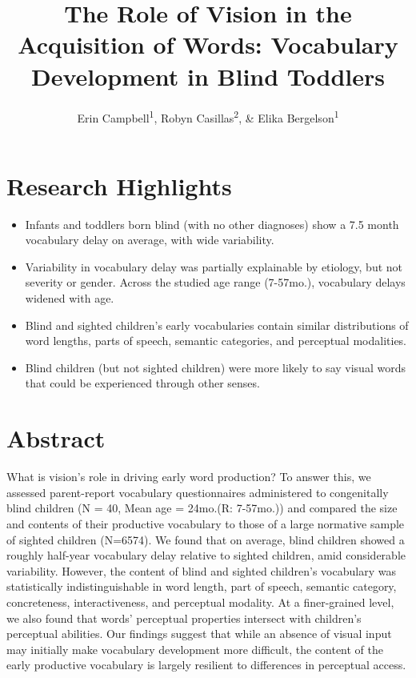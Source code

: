 \documentclass[
  man,floatsintext]{apa6}
\title{The Role of Vision in the Acquisition of Words: Vocabulary Development in Blind Toddlers}
\author{Erin Campbell\textsuperscript{1}, Robyn Casillas\textsuperscript{2}, \& Elika Bergelson\textsuperscript{1}}
\date{}
\affiliation{\vspace{0.5cm}\textsuperscript{1} Duke University\\\textsuperscript{2} Independent Researcher}
\providecommand{\tightlist}{%
  \setlength{\itemsep}{0pt}\setlength{\parskip}{0pt}}
\begin{document}
\maketitle

\hypertarget{research-highlights}{%
\section{Research Highlights}\label{research-highlights}}

\begin{itemize}
\tightlist
\item
  Infants and toddlers born blind (with no other diagnoses) show a 7.5 month vocabulary delay on average, with wide variability.
\item
  Variability in vocabulary delay was partially explainable by etiology, but not severity or gender. Across the studied age range (7-57mo.), vocabulary delays widened with age.
\item
  Blind and sighted children's early vocabularies contain similar distributions of word lengths, parts of speech, semantic categories, and perceptual modalities.
\item
  Blind children (but not sighted children) were more likely to say visual words that could be experienced through other senses.
\end{itemize}

\hypertarget{abstract}{%
\section{Abstract}\label{abstract}}

What is vision's role in driving early word production? To answer this, we assessed parent-report vocabulary questionnaires administered to congenitally blind children (N = 40, Mean age = 24mo.(R: 7-57mo.)) and compared the size and contents of their productive vocabulary to those of a large normative sample of sighted children (N=6574). We found that on average, blind children showed a roughly half-year vocabulary delay relative to sighted children, amid considerable variability. However, the content of blind and sighted children's vocabulary was statistically indistinguishable in word length, part of speech, semantic category, concreteness, interactiveness, and perceptual modality. At a finer-grained level, we also found that words' perceptual properties intersect with children's perceptual abilities. Our findings suggest that while an absence of visual input may initially make vocabulary development more difficult, the content of the early productive vocabulary is largely resilient to differences in perceptual access.
\end{document}
